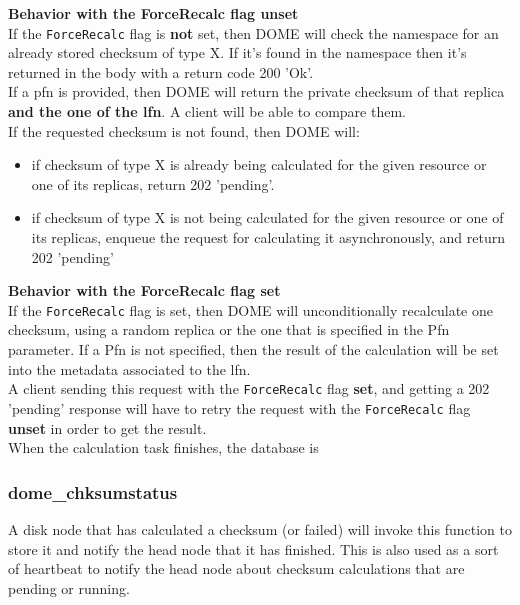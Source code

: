 \documentclass[a4paper,10pt]{scrreprt}
\begin{document}
\textbf{Behavior with the ForceRecalc flag unset}\\

If the \lstinline"ForceRecalc" flag is \textbf{not} set, then DOME will check
the namespace for an already stored checksum of type X. If it's found in the namespace then it's returned in the body with a return code 200 'Ok'.\\

If a pfn is provided, then DOME will return the private checksum of that replica \textbf{and the one of the lfn}. A client will be able to compare them.\\

If the requested checksum is not found, then DOME will:\\
\begin{itemize}
 \item if checksum of type X is already being calculated for the given resource or one of its replicas, return 202 'pending'.
 \item if checksum of type X is not being calculated for the given resource or one of its replicas, enqueue the request for calculating it asynchronously, and return 202 'pending'
\end{itemize}


\textbf{Behavior with the ForceRecalc flag set}\\

If the \lstinline"ForceRecalc" flag is set, then DOME will unconditionally recalculate one checksum, using a random replica or the one that is specified in the Pfn parameter.
If a Pfn is not specified, then the result of the calculation will be set into the metadata associated to the lfn.\\
A client sending this request with the  \lstinline"ForceRecalc" flag \textbf{set}, and getting a 202 'pending' response will have to retry the request with the \lstinline"ForceRecalc" flag \textbf{unset} in order to get the result.\\
When the calculation task finishes, the database is

\subsubsection{dome\_chksumstatus}
A disk node that has calculated a checksum (or failed) will invoke this function to store it and notify the head node that it has finished.
This is also used as a sort of heartbeat to notify the head node about checksum calculations that are pending or running.
\end{document}
